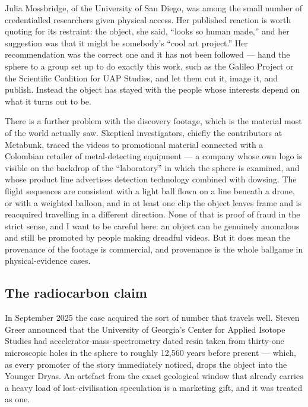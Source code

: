 Julia Mossbridge, of the University of San Diego, was among the small number of credentialled
researchers given physical access. Her published reaction is worth quoting for its restraint: the
object, she said, ``looks so human made,'' and her suggestion was that it might be somebody's ``cool
art project.'' Her recommendation was the correct one and it has not been followed --- hand the sphere
to a group set up to do exactly this work, such as the Galileo Project or the Scientific Coalition for
UAP Studies, and let them cut it, image it, and publish. Instead the object has stayed with the people
whose interests depend on what it turns out to be.

There is a further problem with the discovery footage, which is the material most of the world actually
saw. Skeptical investigators, chiefly the contributors at Metabunk, traced the videos to promotional
material connected with a Colombian retailer of metal-detecting equipment --- a company whose own logo
is visible on the backdrop of the ``laboratory'' in which the sphere is examined, and whose product
line advertises detection technology combined with dowsing. The flight sequences are consistent with a
light ball flown on a line beneath a drone, or with a weighted balloon, and in at least one clip the
object leaves frame and is reacquired travelling in a different direction. None of that is proof of
fraud in the strict sense, and I want to be careful here: an object can be genuinely anomalous and
still be promoted by people making dreadful videos. But it does mean the provenance of the footage is
commercial, and provenance is the whole ballgame in physical-evidence cases.

\subsection{The radiocarbon claim}

In September 2025 the case acquired the sort of number that travels well. Steven Greer announced that
the University of Georgia's Center for Applied Isotope Studies had accelerator-mass-spectrometry dated
resin taken from thirty-one microscopic holes in the sphere to roughly 12,560 years before present ---
which, as every promoter of the story immediately noticed, drops the object into the Younger Dryas.
An artefact from the exact geological window that already carries a heavy load of lost-civilisation
speculation is a marketing gift, and it was treated as one.

